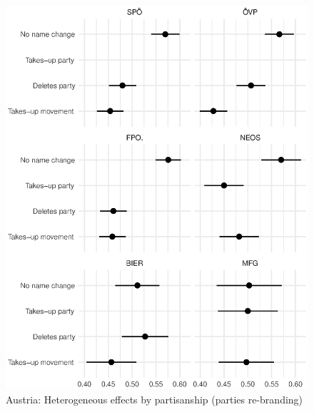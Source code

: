 \documentclass[12pt]{article}
\begin{document}
\begin{figure}[H]
\includegraphics[width=\textwidth]{./Figures/CJ2_by_party_tradeoff_Austria.eps}
\caption{Austria: Heterogeneous effects by partisanship (parties re-branding)}
\end{figure}
\end{document}
